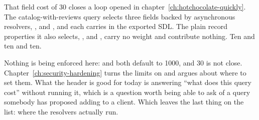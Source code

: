 That field cost of 30 closes a loop opened in
chapter~\ref{ch:hotchocolate-quickly}. The catalog-with-reviews query selects
three fields backed by asynchronous resolvers, , 
and , and each carries  in the exported
SDL. The plain record properties it also selects, , 
and , carry no weight and contribute nothing. Ten and ten and
ten.

Nothing is being enforced here:  and  both
default to 1000, and 30 is not close. Chapter~\ref{ch:security-hardening} turns
the limits on and argues about where to set them. What the header is good for
today is answering \enquote{what does this query cost} without running it, which
is a question worth being able to ask of a query somebody has proposed adding to
a client. Which leaves the last thing on the list: where the resolvers actually
run.
